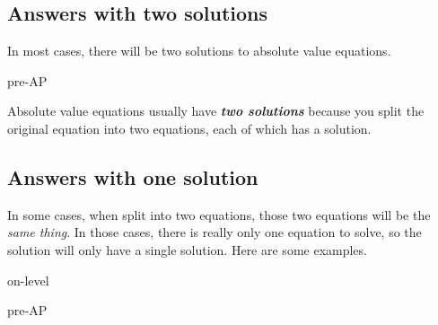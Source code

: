 \subsection*{Answers with two solutions}

In most cases, there will be two solutions to absolute value equations.









\begin{taggedblock}{pre-AP}
\end{taggedblock}

\begin{center}
    \begin{tcolorbox}[width=4in]
        Absolute value equations usually have {\bfseries\itshape two solutions}
        because you split the original equation into two equations,
        each of which has a solution.
    \end{tcolorbox}
\end{center}



\subsection*{Answers with one solution}

In some cases, when split into two equations, those two equations will be the \emph{same thing}.
In those cases, there is really only one equation to solve, so the solution will only have a single solution.
Here are some examples.

\begin{taggedblock}{on-level}
\end{taggedblock}
\begin{taggedblock}{pre-AP}
\end{taggedblock}

